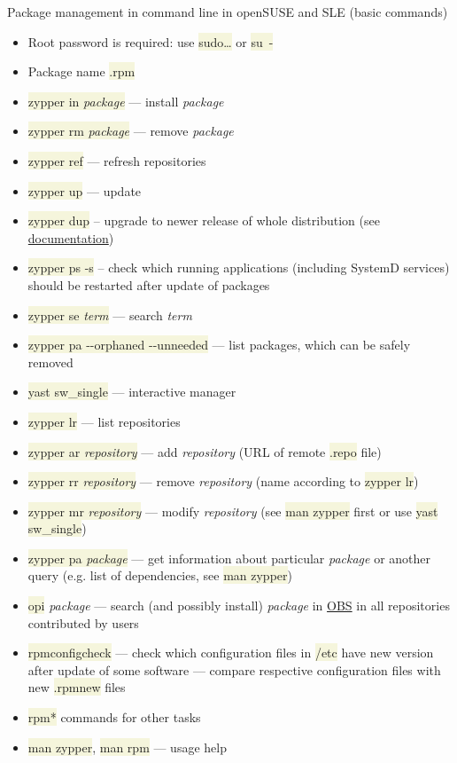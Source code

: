 \documentclass[compress, ucs, xelatex, 11pt, xcolor=svgnames, aspectratio=169,
	hyperref={
		bookmarks=true,
		unicode=true,
		colorlinks=true,
		pdftitle={Linux, command line and MetaCentrum},
		plainpages=false,
		pdfauthor={Vojtech Zeisek},
		pdfsubject={Course about use of Linux command line, writing shell scripts and using MetaCentrum of CESNET},
		pdfcreator={XeLaTeX},
		pdfkeywords={Linux, GNU, BASH, shell, command line, MetaCentrum},
		linkcolor=DarkRed, %
		anchorcolor=DarkBlue, %
		citecolor=Indigo, %
		filecolor=NavyBlue, %
		menucolor=DarkMagenta, %
		urlcolor=DarkBlue, %
		pdftex},
	url={hyphens, lowtilde} %
	]{beamer}
\renewcommand{\texttt}[1]{\colorbox{Beige}{{\ttfamily #1}}}
\begin{document}
\begin{frame}[allowframebreaks]{Package management in command line in openSUSE and SLE (basic commands)}
	\begin{itemize}
		\item Root password is required: use \texttt{sudo\ldots} or \texttt{su~-}
		\item Package name \texttt{*.rpm}
		\item \texttt{zypper in \textit{package}} --- install \textit{package}
		\item \texttt{zypper rm \textit{package}} --- remove \textit{package}
		\item \texttt{zypper ref} --- refresh repositories
		\item \texttt{zypper up} --- update
		\item \texttt{zypper dup} -- upgrade to newer release of whole distribution (see \href{https://en.opensuse.org/SDB:System_upgrade}{documentation})
		\item \texttt{zypper ps -s} -- check which running applications (including SystemD services) should be restarted after update of packages
		\item \texttt{zypper se \textit{term}} --- search \textit{term}
		\item \texttt{zypper pa -{-}orphaned -{-}unneeded} --- list packages, which can be safely removed
		\item \texttt{yast sw\_single} --- interactive manager
		\item \texttt{zypper lr} --- list repositories
		\item \texttt{zypper ar \textit{repository}} --- add \textit{repository} (URL of remote \texttt{*.repo} file)
		\item \texttt{zypper rr \textit{repository}} --- remove \textit{repository} (name according to \texttt{zypper lr})
		\item \texttt{zypper mr \textit{repository}} --- modify \textit{repository} (see \texttt{man zypper} first or use \texttt{yast sw\_single})
		\item \texttt{zypper pa \textit{package}} --- get information about particular \textit{package} or another query (e.g. list of dependencies, see \texttt{man zypper})
		\item \texttt{opi} \textit{package} --- search (and possibly install) \textit{package} in \href{https://build.opensuse.org/}{OBS} in all repositories contributed by users
		\item \texttt{rpmconfigcheck} --- check which configuration files in \texttt{/etc} have new version after update of some software --- compare respective configuration files with new \texttt{*.rpmnew} files
		\item \texttt{rpm*} commands for other tasks
		\item \texttt{man zypper}, \texttt{man rpm} --- usage help
	\end{itemize}
\end{frame}
\end{document}
